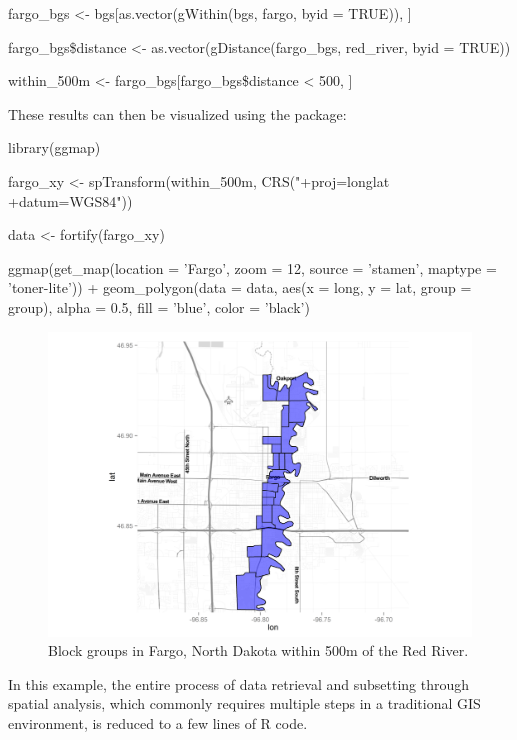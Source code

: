 \begin{Schunk}
\begin{Sinput}
fargo_bgs <- bgs[as.vector(gWithin(bgs, fargo, byid = TRUE)), ]

fargo_bgs\$distance <- as.vector(gDistance(fargo_bgs, red_river, byid = TRUE))

within_500m <- fargo_bgs[fargo_bgs\$distance < 500, ]
\end{Sinput}
\end{Schunk}

These results can then be visualized using the  package:

\begin{Schunk}
\begin{Sinput}
library(ggmap)

fargo_xy <- spTransform(within_500m, CRS("+proj=longlat +datum=WGS84"))

data <- fortify(fargo_xy)

ggmap(get_map(location = 'Fargo', zoom = 12, source = 'stamen', maptype = 'toner-lite')) + 
  geom_polygon(data = data, aes(x = long, y = lat, group = group), 
               alpha = 0.5, fill = 'blue', color = 'black')
\end{Sinput}
\end{Schunk}

\begin{figure}[htbp]
  \centering
  \includegraphics[width=\textwidth]{fargo_map}
  \caption{Block groups in Fargo, North Dakota within 500m of the Red River.}
  \label{figure:fargo_map}
\end{figure}

In this example, the entire process of data retrieval and subsetting
through spatial analysis, which commonly requires multiple steps in a
traditional GIS environment, is reduced to a few lines of R code.

